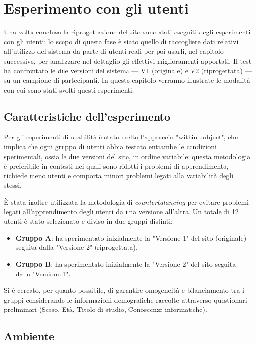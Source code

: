 \chapter{Esperimento con gli utenti}
\label{ch:esperimento}

Una volta conclusa la riprogettazione del sito sono stati eseguiti degli esperimenti con gli utenti: lo scopo di questa fase è stato quello di raccogliere dati relativi all'utilizzo del sistema da parte di utenti reali per poi usarli, nel capitolo successivo, per analizzare nel dettaglio gli effettivi miglioramenti apportati.
Il test ha confrontato le due versioni del sistema --- V1 (originale) e V2 (riprogettata) --- su un campione di partecipanti. In questo capitolo verranno illustrate le modalità con cui sono stati svolti questi esperimenti.

\section{Caratteristiche dell'esperimento}

Per gli esperimenti di usabilità è stato scelto l'approccio "within-subject", che implica che ogni gruppo di utenti abbia testato entrambe le condizioni sperimentali, ossia le due versioni del sito, in ordine variabile: questa metodologia è preferibile in contesti nei quali sono ridotti i problemi di apprendimento, richiede meno utenti e comporta minori problemi legati alla variabilità degli stessi.

È stata inoltre utilizzata la metodologia di \textit{counterbalancing} per evitare problemi legati all'apprendimento degli utenti da una versione all'altra. Un totale di 12 utenti è stato selezionato e diviso in due gruppi distinti:
\begin{itemize}
    \item \textbf{Gruppo A}: ha sperimentato inizialmente la "Versione 1" del sito (originale) seguita dalla "Versione 2" (riprogettata).
    \item \textbf{Gruppo B}: ha sperimentato inizialmente la "Versione 2" del sito seguita dalla "Versione 1".
\end{itemize}

Si è cercato, per quanto possibile, di garantire omogeneità e bilanciamento tra i gruppi considerando le informazioni demografiche raccolte attraverso questionari preliminari (Sesso, Età, Titolo di studio, Conoscenze informatiche).

\section{Ambiente}

